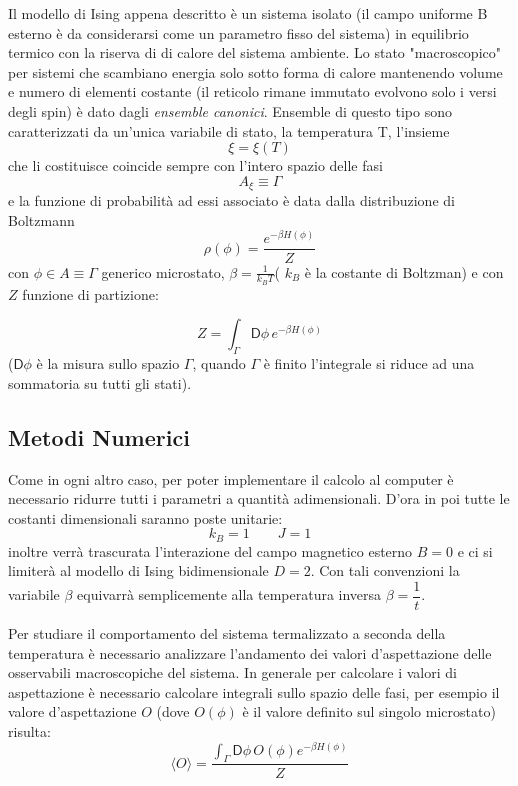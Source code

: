 Il modello di Ising appena descritto è un sistema isolato (il campo uniforme B esterno è da considerarsi come un parametro fisso del sistema) in equilibrio termico con la riserva di di calore del sistema ambiente.
Lo stato "macroscopico" per sistemi che scambiano energia solo sotto forma di calore mantenendo volume e numero di elementi costante (il reticolo rimane immutato evolvono solo i versi degli spin) è dato dagli \emph{ensemble canonici}. 
Ensemble di questo tipo sono caratterizzati da un'unica variabile di stato, la temperatura T, l'insieme $$\xi = \xi(T)$$ che li costituisce coincide sempre con l'intero spazio delle fasi 
$$A_{\xi}\equiv \Gamma$$
e la funzione di probabilità ad essi associato è data dalla distribuzione di Boltzmann
$$\rho(\phi) = \frac{e^{-\beta H(\phi)}}{Z} $$
con $\phi \in A\equiv \Gamma$ generico microstato, $\beta = \frac{1}{k_{B}T} $( $k_B$ è la costante di Boltzman) e con $Z$ funzione di partizione: 

\begin{equation}\label{Partizione}
Z = \int_{\Gamma} \textsf{D}\phi \, e^{-\beta H(\phi)}
\end{equation}
($\textsf{D}\phi$ è la misura sullo spazio $\Gamma$, quando $\Gamma$ è finito l'integrale si riduce ad una sommatoria su tutti gli stati).


\subsection{Metodi Numerici}

Come in ogni altro caso, per poter implementare il calcolo al computer è necessario ridurre tutti i parametri a quantità adimensionali. D'ora in poi tutte le costanti dimensionali saranno poste unitarie:
$$ k_B = 1 \qquad J=1$$
inoltre verrà trascurata l'interazione del campo magnetico esterno $B=0$ e ci si limiterà al modello di Ising bidimensionale $D=2$.
\newline
Con tali convenzioni la variabile $\beta$ equivarrà semplicemente alla temperatura inversa $\beta= \dfrac{1}{t}$.
\medskip

Per studiare il comportamento del sistema termalizzato a seconda della temperatura è necessario analizzare l'andamento dei valori d'aspettazione delle osservabili macroscopiche del sistema.
In generale per calcolare i valori di aspettazione è necessario calcolare integrali sullo spazio delle fasi, per esempio il valore d'aspettazione $O$ (dove $O(\phi)$ è il valore definito sul singolo microstato) risulta: 
\begin{equation}\label{aspettazione teo}
\langle O \rangle = \frac{\int_{\Gamma} \textsf{D}\phi \,O(\phi) e^{-\beta H(\phi)}}{Z}
\end{equation}

